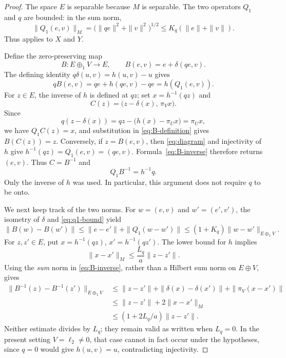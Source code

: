 \begin{proof}
The space \(E\) is separable because \(M\) is separable. The two
operators \(Q_1\) and \(q\) are bounded: in the sum norm,
\begin{equation}
\label{eq:q1-bound}
 \|Q_1(e,v)\|_M
 =\bigl(\|qe\|^2+\|v\|^2\bigr)^{1/2}
 \le K_q(\|e\|+\|v\|).
\end{equation}
Thus  applies to \(X\) and \(Y\).

Define the zero-preserving map
\begin{equation}
\label{eq:B-definition}
 B:E\oplus_1V\to E,\qquad B(e,v)=e+\delta(qe,v).
\end{equation}
The defining identity \(q\delta(u,v)=h(u,v)-u\) gives
\begin{equation}
\label{eq:diagram}
 qB(e,v)=qe+h(qe,v)-qe=h(Q_1(e,v)).
\end{equation}
For \(z\in E\), the inverse of \(h\) is defined at \(qz\); set
\(x=h^{-1}(qz)\) and
\begin{equation}
\label{eq:B-inverse}
 C(z)=\bigl(z-\delta(x),\,\pi_Vx\bigr).
\end{equation}
Since
\[
 q(z-\delta(x))
 =qz-\bigl(h(x)-\pi_Ux\bigr)=\pi_Ux,
\]
we have \(Q_1C(z)=x\), and substitution in \eqref{eq:B-definition}
gives \(B(C(z))=z\). Conversely, if \(z=B(e,v)\), then
\eqref{eq:diagram} and injectivity of \(h\) give
\(h^{-1}(qz)=Q_1(e,v)=(qe,v)\). Formula~\eqref{eq:B-inverse}
therefore returns \((e,v)\). Thus \(C=B^{-1}\) and
\begin{equation}
\label{eq:inverse-diagram}
 Q_1B^{-1}=h^{-1}q.
\end{equation}
Only the inverse of \(h\) was used. In particular, this argument does
not require \(q\) to be onto.

We next keep track of the two norms. For \(w=(e,v)\) and
\(w'=(e',v')\), the isometry of \(\delta\) and
\eqref{eq:q1-bound} yield
\[
 \|B(w)-B(w')\|
 \le\|e-e'\|+\|Q_1(w-w')\|
 \le(1+K_q)\|w-w'\|_{E\oplus_1V}.
\]
For \(z,z'\in E\), put \(x=h^{-1}(qz)\),
\(x'=h^{-1}(qz')\). The lower bound for \(h\) implies
\[
 \|x-x'\|_M\le\frac{L_q}{a}\|z-z'\|.
\]
Using the \emph{sum} norm in \eqref{eq:B-inverse}, rather than a
Hilbert sum norm on \(E\oplus V\), gives
\begin{align*}
 \|B^{-1}(z)-B^{-1}(z')\|_{E\oplus_1V}
 &\le\|z-z'\|+\|\delta(x)-\delta(x')\|+\|\pi_V(x-x')\|\\
 &\le\|z-z'\|+2\|x-x'\|_M\\
 &\le(1+2L_q/a)\|z-z'\|.
\end{align*}
Neither estimate divides by \(L_q\); they remain valid as written
when \(L_q=0\). In the present setting \(V=\ell_2\ne0\), that case
cannot in fact occur under the hypotheses, since \(q=0\) would give
\(h(u,v)=u\), contradicting injectivity.


\end{proof}
